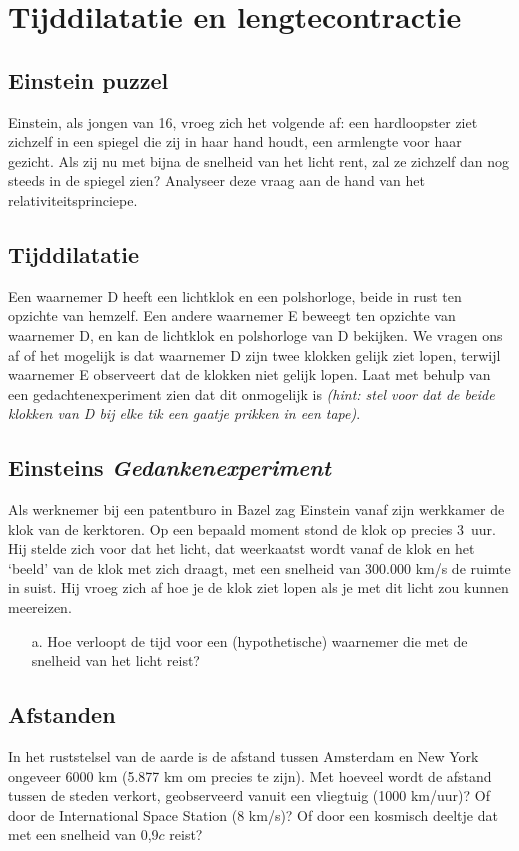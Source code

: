 \section{Tijddilatatie en lengtecontractie}



\subsection{Einstein puzzel}
Einstein, als jongen van 16, vroeg zich het volgende af: een hardloopster
ziet zichzelf in een spiegel die zij in haar hand houdt, een armlengte
voor haar gezicht. Als zij nu met bijna de snelheid van het licht
rent, zal ze zichzelf dan nog steeds in de spiegel zien? Analyseer deze
vraag aan de hand van het relativiteitsprinciepe.

\subsection{Tijddilatatie}
Een waarnemer D heeft een lichtklok en een polshorloge, beide in rust
ten opzichte van hemzelf.  Een andere waarnemer E beweegt ten opzichte
van waarnemer D, en kan de lichtklok en polshorloge van D bekijken.
We vragen ons af of het mogelijk is dat waarnemer D zijn twee klokken
gelijk ziet lopen, terwijl waarnemer E observeert dat de klokken niet
gelijk lopen. Laat met behulp van een gedachtenexperiment zien dat dit
onmogelijk is \textit{(hint: stel voor dat de beide klokken van D bij elke tik
een gaatje prikken in een tape)}.


\subsection{Einsteins \textit{Gedankenexperiment}}
Als werknemer bij een patentburo in Bazel zag Einstein vanaf zijn
werkkamer de klok van de kerktoren. Op een bepaald moment stond de
klok op precies 3~uur.  Hij stelde zich voor dat het licht, dat
weerkaatst wordt vanaf de klok en het `beeld' van de klok met zich
draagt, met een snelheid van 300.000 km/s de ruimte in suist. Hij vroeg
zich af hoe je de klok ziet lopen als je met dit licht zou kunnen
meereizen.
\begin{itemize}
\item [a.] Hoe verloopt de tijd voor een (hypothetische) waarnemer die met de snelheid van het licht reist?
\end{itemize}

\subsection{Afstanden}
In het ruststelsel van de aarde is de afstand tussen Amsterdam en New
York ongeveer 6000 km (5.877 km om precies te zijn). Met hoeveel wordt
de afstand tussen de steden verkort, geobserveerd vanuit een
vliegtuig (1000 km/uur)? Of door de International Space Station (8
km/s)? Of door een kosmisch deeltje dat met een snelheid van 0,9$c$
reist?

